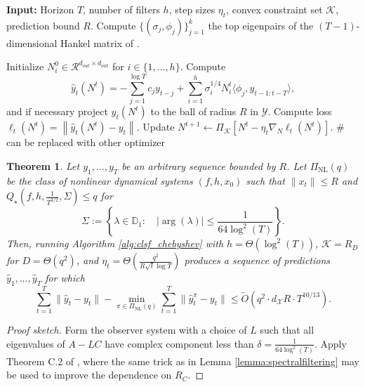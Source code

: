 \documentclass[11pt]{article}
\def\K{{\mathcal K}}
\def\R{{\mathcal R}}
\newcommand{\norm}[1]{\left\lVert#1\right\rVert}
\def\R{\ensuremath{\mathcal R}}
\newtheorem{theorem}{Theorem}[section]
\numberwithin{equation}{section}
\begin{document}
\begin{algorithm}[htb]
\caption{Observation Spectral Filtering + Chebyshev}
\label{alg:clsf_chebyshev}
\begin{algorithmic}[1]
\STATE \textbf{Input:} Horizon \(T\), number of filters \(h\), step sizes $\eta_t$, convex constraint set \(\K\), prediction bound $R$.
\STATE Compute $\{(\sigma_j, {\phi}_j)\}_{j=1}^k$ the top eigenpairs of the $(T-1)$-dimensional Hankel matrix of \cite{hazan2017learning}.

\STATE Initialize $N_i^0\in \R^{d_{out} \times d_{out}}$ for $i \in \{1, \ldots, h\}$. 
\STATE Compute $$\hat{y}_t(N^t) = -\sum_{j=1}^{\log T}c_jy_{t-j} +  \sum_{i=1}^h \sigma_i^{1/4}N_i^t \langle \phi_{j} ,  y_{t-1:t-T} \rangle, $$
and if necessary project $\hat{y}_t(N^t)$ to the ball of radius $R$ in $\mathcal{Y}$.
\STATE Compute loss $\ell_t(N^t) = \norm{\hat{y}_t(N^t) - y_t}$.
\STATE Update $N^{t+1} \leftarrow \Pi_\K\left[N^t - \eta_t  \nabla_N \ell_t(N^t)\right]$. 
\hfill \textcolor[HTML]{408080}{\# can be replaced with other optimizer}
\ENDFOR
\end{algorithmic}
\end{algorithm}

    
\begin{theorem}
    Let $y_1, \ldots, y_T$ be an arbitrary sequence bounded by $R$. Let $\Pi_{\mathrm{NL}}(q)$ be the class of nonlinear dynamical systems $(f, h, x_0)$ such that $\|x_t\| \leq R$ and $Q_\star\left( f, h, \frac{1}{T^{3/2}}, \Sigma\right) \leq q$ for $$\Sigma := \left\{\lambda \in \mathbb{D}_1 : \quad |\arg(\lambda)| \leq \frac{1}{64 \log^2(T)} \right\}.$$
    Then, running Algorithm \ref{alg:clsf_chebyshev} with $h = \Theta(\log^2(T))$, $\mathcal{K} = R_D$ for $D = \Theta(q^2)$, and $\eta_t = \Theta\left(\frac{q^2}{R\sqrt{t}\log T}\right)$ produces a sequence of predictions $\hat{y}_1, \ldots, \hat{y}_T$ for which
    $$\sum_{t=1}^T \|\hat{y}_t - y_t\| - \min_{\pi \in \Pi_{\text{NL}}(q)} \sum_{t=1}^T \|\hat{y}_t^\pi - y_t\| \leq \widetilde{O}\left(q^2 \cdot d_\mathcal{X} R \cdot T^{10/13}\right) . $$
\end{theorem}
\begin{proof}[Proof sketch]
    Form the observer system with a choice of $L$ such that all eigenvalues of $A - LC$ have complex component less than $\delta = \frac{1}{64 \log^2(T)}$. Apply Theorem C.2 of \cite{marsden2025universalsequencepreconditioning}, where the same trick as in Lemma \ref{lemma:spectralfiltering} may be used to improve the dependence on $R_C$.
\end{proof}
\end{document}

